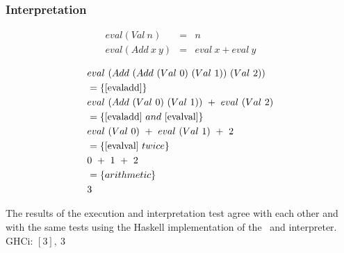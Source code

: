 \documentclass {article}
\begin{document}
\subsubsection{Interpretation}

\begin{eqnarray}
	 eval (Val\  n) &=& n \label{evalval}\\
	 eval (Add\  x\  y) &=& eval\  x + eval\  y \label{evaladd}
\end{eqnarray}

\begin{align*}
	&eval\ (Add\ (Add\ (Val\ 0)\ (Val\ 1))\ (Val\ 2)) \\
	&= \{ \ref{evaladd} \} \\
	&eval\ (Add\ (Val\ 0)\ (Val\ 1))\ +\ eval\ (Val\ 2) \\
	&= \{ \ref{evaladd}\ and\ \ref{evalval} \} \\
	&eval\ (Val\ 0)\ +\ eval\ (Val\ 1)\ +\ 2 \\
	&= \{ \ref{evalval}\ twice\} \\
	&0\ +\ 1\ +\ 2 \\
	&= \{ arithmetic \} \\
	&3
\end{align*}

The results of the execution and interpretation test
agree with each other and with the same tests
using the Haskell implementation of the \vm\ and interpreter.
GHCi: \( [3],\ 3 \)


%
\end{document}
